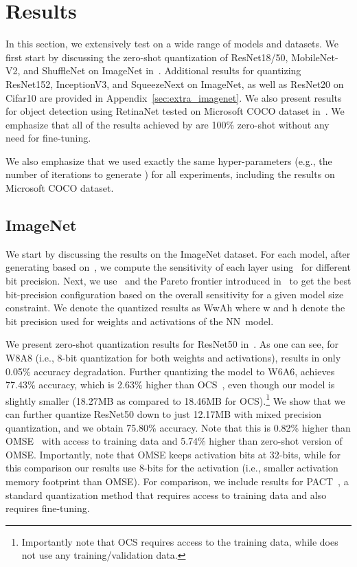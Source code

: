 \section{Results}\label{sec:results}
In this section, we extensively test \OURS on a wide range of models and datasets.
We first start by discussing the zero-shot quantization of ResNet18/50, MobileNet-V2, and ShuffleNet on ImageNet in~. 
Additional results for quantizing ResNet152, InceptionV3, and SqueezeNext on ImageNet, as well as ResNet20 on Cifar10 are provided in Appendix~\ref{sec:extra_imagenet}. 
We also present results for object detection using RetinaNet tested on Microsoft COCO dataset in~. 
We emphasize that all of the results achieved by \OURS are 100\% zero-shot without any need for fine-tuning. 


We also emphasize that we used exactly the same
hyper-parameters (e.g., the number of iterations to generate \rg) for all experiments, including the results on Microsoft COCO dataset.



\subsection{ImageNet}\label{sec:imagenet_result}
We start by discussing the results on the ImageNet dataset.
For each model, after generating \rg based on~, we compute the sensitivity of each layer using~ for different bit precision.
Next, we use~ and the Pareto frontier introduced in~ to get the best bit-precision configuration based on the overall sensitivity for a given model size constraint. 
We denote the quantized results as WwAh where w and h denote the bit precision used for weights and
activations of the NN~model.

We present zero-shot quantization results for ResNet50 in~.
As one can see, for W8A8 (i.e., 8-bit quantization for both weights and
activations), \OURS results in only 0.05\% accuracy degradation.
Further quantizing the model to W6A6, \OURS achieves 77.43\% accuracy, which is 
2.63\% higher than OCS~\cite{zhao2019improving}, even though our model is slightly smaller (18.27MB as compared to 18.46MB for OCS).\footnote{Importantly note that OCS requires access to the training data, while \OURS does not use any training/validation data.}
We show that we can further quantize ResNet50 down to just 12.17MB with mixed precision quantization, 
and we obtain 75.80\% accuracy. Note that this is 0.82\% higher than OMSE~\cite{Kravchik_2019_ICCV} with access to training data and 5.74\% higher than zero-shot version of OMSE. Importantly, note that OMSE keeps
activation bits at 32-bits, while for this comparison our results use 8-bits for the activation (i.e.,  smaller activation memory footprint than OMSE).
For comparison, we include results for PACT~\cite{choi2018pact}, a standard quantization method that requires access to training data and also requires fine-tuning. 

